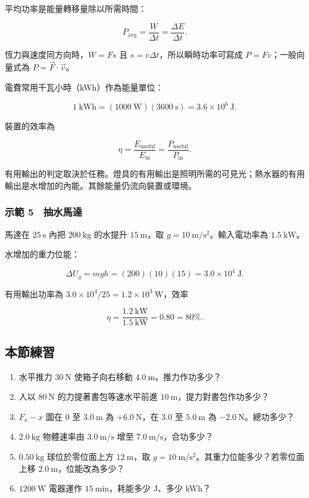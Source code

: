 \documentclass[11pt,a4paper]{article}
\providecommand{\tightlist}{%
  \setlength{\itemsep}{0pt}\setlength{\parskip}{0pt}}
\begin{document}
平均功率是能量轉移量除以所需時間：

\[
P_{\mathrm{avg}}=\frac{W}{\Delta t}=\frac{\Delta E}{\Delta t}.
\]

恆力與速度同方向時，\(W=Fs\) 且 \(s=v\Delta t\)，所以瞬時功率可寫成 \(P=Fv\)；一般向量式為 \(P=\vec F\cdot\vec v\)。

電費常用千瓦小時（kWh）作為能量單位：

\[
1\ \mathrm{kWh}=(1000\ \mathrm W)(3600\ \mathrm s)
=3.6\times10^6\ \mathrm J.
\]

裝置的效率為

\[
\eta=\frac{E_{\mathrm{useful}}}{E_{\mathrm{in}}}
=\frac{P_{\mathrm{useful}}}{P_{\mathrm{in}}}.
\]

有用輸出的判定取決於任務。燈具的有用輸出是照明所需的可見光；熱水器的有用輸出是水增加的內能。其餘能量仍流向裝置或環境。

\subsubsection{示範 5　抽水馬達}\label{ux793aux7bc4-5-ux62bdux6c34ux99acux9054}

馬達在 \(25\ \mathrm s\) 內把 \(200\ \mathrm{kg}\) 的水提升 \(15\ \mathrm m\)，取 \(g=10\ \mathrm{m/s^2}\)。輸入電功率為 \(1.5\ \mathrm{kW}\)。

水增加的重力位能：

\[
\Delta U_g=mgh=(200)(10)(15)=3.0\times10^4\ \mathrm J.
\]

有用輸出功率為 \(3.0\times10^4/25=1.2\times10^3\ \mathrm W\)，效率

\[
\eta=\frac{1.2\ \mathrm{kW}}{1.5\ \mathrm{kW}}=0.80=80\%.
\]

\subsection{本節練習}\label{ux672cux7bc0ux7df4ux7fd2}

\begin{enumerate}
\def\labelenumi{\arabic{enumi}.}
\tightlist
\item
  水平推力 \(30\ \mathrm N\) 使箱子向右移動 \(4.0\ \mathrm m\)，推力作功多少？
\item
  人以 \(80\ \mathrm N\) 的力提著書包等速水平前進 \(10\ \mathrm m\)，提力對書包作功多少？
\item
  \(F_x-x\) 圖在 \(0\) 至 \(3.0\ \mathrm m\) 為 \(+6.0\ \mathrm N\)，在 \(3.0\) 至 \(5.0\ \mathrm m\) 為 \(-2.0\ \mathrm N\)。總功多少？
\item
  \(2.0\ \mathrm{kg}\) 物體速率由 \(3.0\ \mathrm{m/s}\) 增至 \(7.0\ \mathrm{m/s}\)，合功多少？
\item
  \(0.50\ \mathrm{kg}\) 球位於零位面上方 \(12\ \mathrm m\)，取 \(g=10\ \mathrm{m/s^2}\)。其重力位能多少？若零位面上移 \(2.0\ \mathrm m\)，位能改為多少？
\item
  \(1200\ \mathrm W\) 電器運作 \(15\ \mathrm{min}\)，耗能多少 J、多少 kWh？
\end{enumerate}
\end{document}
